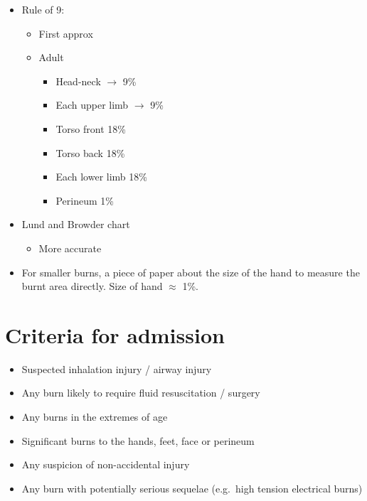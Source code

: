 \documentclass[
  12pt,
]{memoir}
\providecommand{\tightlist}{%
  \setlength{\itemsep}{0pt}\setlength{\parskip}{0pt}}
\begin{document}
\begin{itemize}
\tightlist
\item
  Rule of 9:

  \begin{itemize}
  \tightlist
  \item
    First approx
  \item
    Adult

    \begin{itemize}
    \tightlist
    \item
      Head-neck \(\rightarrow\) 9\%
    \item
      Each upper limb \(\rightarrow\) 9\%
    \item
      Torso front 18\%
    \item
      Torso back 18\%
    \item
      Each lower limb 18\%
    \item
      Perineum 1\%
    \end{itemize}
  \end{itemize}
\item
  Lund and Browder chart

  \begin{itemize}
  \tightlist
  \item
    More accurate
  \end{itemize}
\item
  For smaller burns, a piece of paper about the size of the hand to
  measure the burnt area directly. Size of hand \(\approx\) 1\%.
\end{itemize}

\hypertarget{criteria-for-admission}{%
\section{Criteria for admission}\label{criteria-for-admission}}

\begin{itemize}
\tightlist
\item
  Suspected inhalation injury / airway injury
\item
  Any burn likely to require fluid resuscitation / surgery
\item
  Any burns in the extremes of age
\item
  Significant burns to the hands, feet, face or perineum
\item
  Any suspicion of non-accidental injury
\item
  Any burn with potentially serious sequelae (e.g.~high tension
  electrical burns)
\end{itemize}
\end{document}
